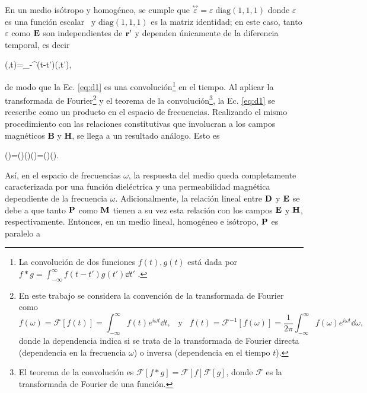 En un medio isótropo y homogéneo, se cumple que $\stackrel{\leftrightarrow}{\varepsilon} = \varepsilon\; \text{diag}(1,1,1)$ donde $\varepsilon$ es una función escalar~\cite{jacksonClassicalElectrodynamics2021} y $\text{diag}(1,1,1)$ es la matriz identidad; en este caso, tanto $\varepsilon$ como $\vb{E}$ son independientes de $\vb{r}'$ y dependen únicamente de la diferencia temporal, es decir \cite{jacksonClassicalElectrodynamics2021}
%
\begin{tcolorbox}
	(,t)=\int_{-\infty}^{\infty}\varepsilon(t-t')(,t'),
	\label{eq:d1} 
\end{tcolorbox}
%
\noindent de modo que la Ec. \eqref{eq:d1} es una convolución\footnote{La convolución de dos funciones $f(t), g(t)$ está dada por $f\ast g=\int_{-\infty}^{\infty}f(t-t')g(t')\dd{t'}$ \cite{arfkenMathematicalMethodsPhysicists2011}.} en el tiempo. Al aplicar la transformada de Fourier\footnote{En este trabajo se considera la convención de la transformada de Fourier como \cite{arfkenMathematicalMethodsPhysicists2011}
	\begin{equation*}
		f(\omega)=\mathscr{F}[f(t)]=\int_{-\infty}^{\infty}f(t)e^{i\omega t}\dd{t},\;\;\; \text{y}\;\;\; f(t)=\mathscr{F}^{-1}[f(\omega)]=\frac{1}{2\pi}\int_{-\infty}^{\infty}f(\omega)e^{i\omega t}\dd{\omega},
	\end{equation*} 
	donde la dependencia indica si se trata de la transformada de Fourier directa (dependencia en la frecuencia $\omega$) o inversa (dependencia en el tiempo $t$).} y el teorema de la convolución\footnote{El teorema de la convolución es $\mathscr{F}[f\ast g]=\mathscr{F}[f]\mathscr{F}[g]$, donde $\mathscr{F}$ es la transformada de Fourier de una función. }, la Ec. \eqref{eq:d1} se reescribe como un producto en el espacio de frecuencias. Realizando el mismo procedimiento con las relaciones constitutivas que involucran a los campos magnéticos $\mathbf{B}$ y $\mathbf{H}$, se llega a un resultado análogo. Esto es \cite{bohrenAbsorptionScatteringLight2008}
%
\begin{tcolorbox}
		(\omega)=\varepsilon(\omega)(\omega)\hspace{2cm}\hspace{2cm}(\omega)=\mu(\omega)(\omega).
	\label{eq:d3_b3} 
\end{tcolorbox}
%
\noindent Así, en el espacio de frecuencias $\omega$, la respuesta del medio queda completamente caracterizada por una función dieléctrica y una permeabilidad magnética dependiente de la frecuencia $\omega$. Adicionalmente, la relación lineal entre $\vb{D}$ y $\vb{E}$ se debe a que tanto $\vb{P}$  como  $\vb{M}$ tienen a su vez esta relación con los campos $\vb{E}$ y $\vb{H}$, respectivamente. Entonces, en un medio lineal, homogéneo e isótropo, $\vb{P}$ es paralelo a 
